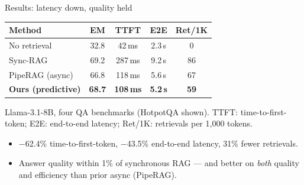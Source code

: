 \documentclass[
t,11pt,notheorems,hyperref={pdfauthor={Wuyang Zhang, Shichao Pei}}
]{beamer}
\renewcommand{\emphasize}[1]{\textcolor{primary}{#1}}
\begin{document}
\begin{frame}{Results: latency down, quality held}
  \begin{center}
    \setlength{\extrarowheight}{2pt}
    \begin{tabular}{lcccc}
      \toprule
      \textbf{Method} & \textbf{EM} & \textbf{TTFT} & \textbf{E2E} & \textbf{Ret/1K} \\
      \midrule
      No retrieval        & 32.8 & 42\,ms  & 2.3\,s & 0 \\
      Sync-RAG            & 69.2 & 287\,ms & 9.2\,s & 86 \\
      PipeRAG (async)     & 66.8 & 118\,ms & 5.6\,s & 67 \\
      \rowcolor{primary!10}\textbf{Ours (predictive)} & \textbf{68.7} & \textbf{108\,ms} & \textbf{5.2\,s} & \textbf{59} \\
      \bottomrule
    \end{tabular}
  \end{center}
  \vspace{0.15cm}
  {\small Llama-3.1-8B, four QA benchmarks (HotpotQA shown). TTFT: time-to-first-token; E2E: end-to-end latency; Ret/1K: retrievals per 1{,}000 tokens.}
  \begin{itemize}
    \item \emphasize{$-$62.4\%} time-to-first-token, \emphasize{$-$43.5\%} end-to-end latency, \emphasize{31\%} fewer retrievals.
    \item Answer quality within \emphasize{1\%} of synchronous RAG --- and better on \emph{both} quality and efficiency than prior async (PipeRAG).
  \end{itemize}
\end{frame}
\end{document}
